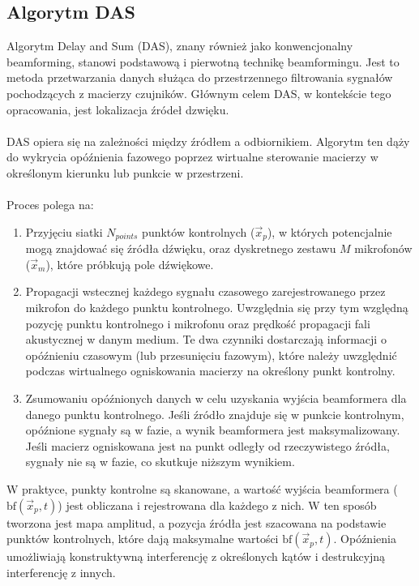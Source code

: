 \documentclass[12pt]{article}
\begin{document}
\subsection{Algorytm DAS}
Algorytm Delay and Sum (DAS), znany również jako konwencjonalny beamforming, stanowi podstawową i pierwotną technikę beamformingu. Jest to metoda przetwarzania danych służąca do przestrzennego filtrowania sygnałów pochodzących z macierzy czujników. Głównym celem DAS, w kontekście tego opracowania, jest lokalizacja źródeł dzwięku.\\\\
DAS opiera się na zależności między źródłem a odbiornikiem. Algorytm ten dąży do wykrycia opóźnienia fazowego poprzez wirtualne sterowanie macierzy w określonym kierunku lub punkcie w przestrzeni.\\\\
Proces polega na:
\begin{enumerate}
    \item Przyjęciu siatki $N_{points}$ punktów kontrolnych ($\vec{x}_p$), w których potencjalnie mogą znajdować się źródła dźwięku, oraz dyskretnego zestawu $M$ mikrofonów ($\vec{x}_m$), które próbkują pole dźwiękowe.
    \item Propagacji wstecznej każdego sygnału czasowego zarejestrowanego przez mikrofon do każdego punktu kontrolnego. Uwzględnia się przy tym względną pozycję punktu kontrolnego i mikrofonu oraz prędkość propagacji fali akustycznej w danym medium. Te dwa czynniki dostarczają informacji o opóźnieniu czasowym (lub przesunięciu fazowym), które należy uwzględnić podczas wirtualnego ogniskowania macierzy na określony punkt kontrolny.
    \item Zsumowaniu opóźnionych danych w celu uzyskania wyjścia beamformera dla danego punktu kontrolnego. Jeśli źródło znajduje się w punkcie kontrolnym, opóźnione sygnały są w fazie, a wynik beamformera jest maksymalizowany. Jeśli macierz ogniskowana jest na punkt odległy od rzeczywistego źródła, sygnały nie są w fazie, co skutkuje niższym wynikiem.
\end{enumerate}
W praktyce, punkty kontrolne są skanowane, a wartość wyjścia beamformera ($\text{bf}(\vec{x}_p, t)$) jest obliczana i rejestrowana dla każdego z nich. W ten sposób tworzona jest mapa amplitud, a pozycja źródła jest szacowana na podstawie punktów kontrolnych, które dają maksymalne wartości $\text{bf}(\vec{x}_p, t)$. Opóźnienia umożliwiają konstruktywną interferencję z określonych kątów i destrukcyjną interferencję z innych.
\end{document}
